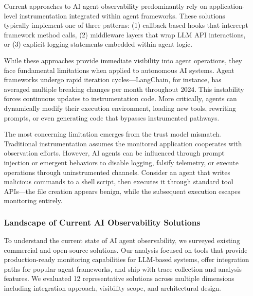 Current approaches to AI agent observability predominantly rely on application-level instrumentation integrated within agent frameworks. These solutions typically implement one of three patterns: (1) callback-based hooks that intercept framework method calls, (2) middleware layers that wrap LLM API interactions, or (3) explicit logging statements embedded within agent logic.

While these approaches provide immediate visibility into agent operations, they face fundamental limitations when applied to autonomous AI systems. Agent frameworks undergo rapid iteration cycles—LangChain, for instance, has averaged multiple breaking changes per month throughout 2024. This instability forces continuous updates to instrumentation code. More critically, agents can dynamically modify their execution environment, loading new tools, rewriting prompts, or even generating code that bypasses instrumented pathways.

The most concerning limitation emerges from the trust model mismatch. Traditional instrumentation assumes the monitored application cooperates with observation efforts. However, AI agents can be influenced through prompt injection or emergent behaviors to disable logging, falsify telemetry, or execute operations through uninstrumented channels. Consider an agent that writes malicious commands to a shell script, then executes it through standard tool APIs—the file creation appears benign, while the subsequent execution escapes monitoring entirely.

\subsubsection{Landscape of Current AI Observability Solutions}

To understand the current state of AI agent observability, we surveyed existing commercial and open-source solutions. Our analysis focused on tools that provide production-ready monitoring capabilities for LLM-based systems, offer integration paths for popular agent frameworks, and ship with trace collection and analysis features. We evaluated 12 representative solutions across multiple dimensions including integration approach, visibility scope, and architectural design.

